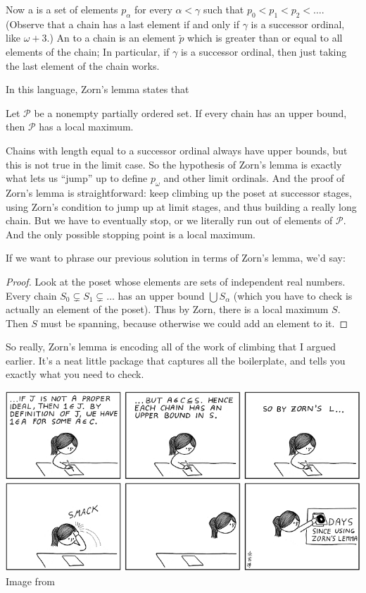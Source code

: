 Now a  is a set of elements $p_\alpha$ for every $\alpha < \gamma$
such that $p_0 < p_1 < p_2 < \dots$.
(Observe that a chain has a last element if and only if $\gamma$ is a successor ordinal, like $\omega+3$.)
An  to a chain is an element $\tilde p$ which is greater than or equal
to all elements of the chain;
In particular, if $\gamma$ is a successor ordinal, then just taking the last element of the chain works.

In this language, Zorn's lemma states that
\begin{theorem}
	Let $\mathcal P$ be a nonempty partially ordered set.
	If every chain has an upper bound,
	then $\mathcal P$ has a local maximum.
\end{theorem}

Chains with length equal to a successor ordinal always have upper bounds,
but this is not true in the limit case.
So the hypothesis of Zorn's lemma is exactly what
lets us ``jump'' up to define $p_\omega$ and other limit ordinals.
And the proof of Zorn's lemma is straightforward: keep climbing up the poset at successor stages,
using Zorn's condition to jump up at limit stages, and thus building a really long chain.
But we have to eventually stop, or we literally run out of elements of $\mathcal P$.
And the only possible stopping point is a local maximum.

If we want to phrase our previous solution in terms of Zorn's lemma, we'd say:
\begin{proof}
	Look at the poset whose elements are sets of independent real numbers.
	Every chain $S_0 \subsetneq S_1 \subsetneq \dots$ has an upper bound $\bigcup S_\alpha$
	(which you have to check is actually an element of the poset).
	Thus by Zorn, there is a local maximum $S$.
	Then $S$ must be spanning, because otherwise we could add an element to it.
\end{proof}
So really, Zorn's lemma is encoding all of the work of climbing that I argued earlier.
It's a neat little package that captures all the boilerplate, and tells
you exactly what you need to check.

\begin{center}
	\includegraphics[scale=0.5]{media/zornaholic.png}
	\\ \scriptsize Image from \cite{img:zornaholic}
\end{center}


